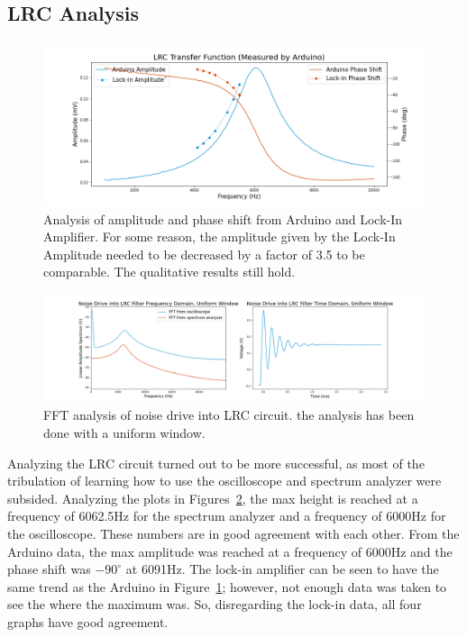 \documentclass[12pt]{article}
\begin{document}
\subsection{LRC Analysis}
 
 \begin{figure}[!ht]
\centering
    \includegraphics[width=\textwidth]{arduino data_}
    \caption{Analysis of amplitude and phase shift from Arduino and Lock-In Amplifier. For some reason, the amplitude given by the Lock-In Amplitude needed to be decreased by a factor of 3.5 to be comparable. The qualitative results still hold.}
    \label{fig:LRC_Arduino}
\end{figure} %

   
\begin{figure}[!ht]
\centering
    \includegraphics[width=\textwidth]{Noise Drive into LRC Filter (uniform)}
    \caption{FFT analysis of noise drive into LRC circuit. the analysis has been done with a uniform window.}
    \label{fig:LRC_fft}
\end{figure} %
       
    
Analyzing the LRC circuit turned out to be more successful, as most of the tribulation of learning how to use the oscilloscope and spectrum analyzer were subsided. Analyzing the plots in Figures~\ref{fig:LRC_fft}, the max height is reached at a frequency of 6062.5Hz for the spectrum analyzer and a frequency of 6000Hz for the oscilloscope. These numbers are in good agreement with each other. From the Arduino data, the max amplitude was reached at a frequency of 6000Hz and the phase shift was $-90^\circ$ at 6091Hz. The lock-in amplifier can be seen to have the same trend as the Arduino in Figure~\ref{fig:LRC_Arduino}; however, not enough data was taken to see the where the maximum was. So, disregarding the lock-in data, all four graphs have good agreement.
\end{document}
